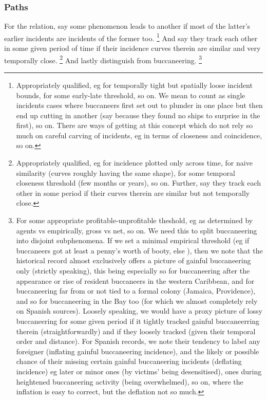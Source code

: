 		\subsubsection{Paths} %
		For the relation, say some phenomenon  leads to another if most of the latter's earlier incidents are incidents of the former too.%
		\footnote{Appropriately qualified, eg for temporally tight but spatially loose incident bounds, for some early-late threshold, so on. We mean to count as single incidents cases where buccaneers first set out to plunder in one place but then end up cutting in another (say because they found no ships to surprise in the first), so on. There are ways of getting at this concept which do not rely so much on careful carving of incidents, eg in terms of closeness and coincidence, so on.}
		And say they  track each other in some given period of time if their incidence curves therein are similar and very temporally close.%
		\footnote{Appropriately qualified, eg for incidence plotted only across time, for naive similarity (curves roughly having the same shape), for some temporal closeness threshold (few months or years), so on. Further, say they  track each other in some period if their curves therein are similar but not temporally close.}
		And lastly distinguish  from  buccaneering.%
		\footnote{For some appropriate profitable-unprofitable theshold, eg as determined by agents vs empirically, gross vs net, so on. We need this to split buccaneering into disjoint subphenomena. If we set a minimal empirical threshold (eg  if buccaneers got at least a penny's worth of booty, else ), then we note that the historical record almost exclusively offers a picture of gainful buccaneering only (strictly speaking), this being especially so for buccaneering after the appearance or rise of resident buccaneers in the western Caribbean, and for buccaneering far from or not tied to a formal colony (Jamaica, Providence), and so for buccaneering in the Bay too (for which we almost completely rely on Spanish sources). Loosely speaking, we would have a proxy picture of lossy buccaneering for some given period if it tightly tracked gainful buccaneerring therein (straightforwardly) and if they loosely tracked (given their temporal order and distance). For Spanish records, we note their tendency to label any foreigner  (inflating gainful buccaneering incidence), and the likely or possible chance of their missing certain gainful buccaneering incidents (deflating incidence) eg later or minor ones (by victims' being desensitised), ones during heightened buccaneering activity (being overwhelmed), so on, where the inflation is easy to correct, but the deflation not so much.} %
